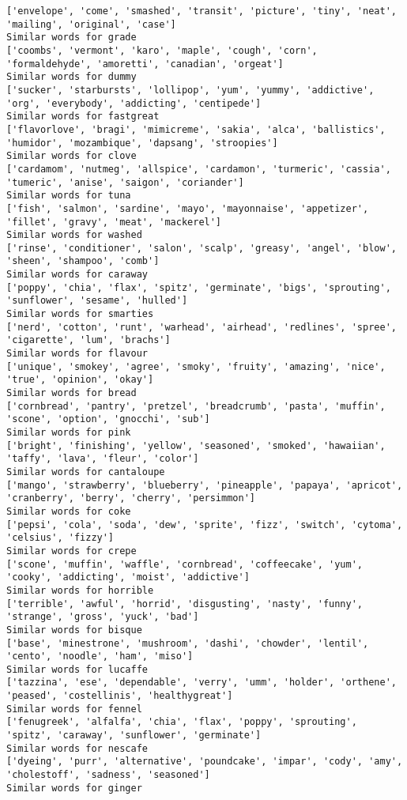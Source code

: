 \documentclass[11pt]{article}
\begin{document}
\begin{Verbatim}[commandchars=\\\{\}]
['envelope', 'come', 'smashed', 'transit', 'picture', 'tiny', 'neat', 'mailing', 'original', 'case']
Similar words for grade
['coombs', 'vermont', 'karo', 'maple', 'cough', 'corn', 'formaldehyde', 'amoretti', 'canadian', 'orgeat']
Similar words for dummy
['sucker', 'starbursts', 'lollipop', 'yum', 'yummy', 'addictive', 'org', 'everybody', 'addicting', 'centipede']
Similar words for fastgreat
['flavorlove', 'bragi', 'mimicreme', 'sakia', 'alca', 'ballistics', 'humidor', 'mozambique', 'dapsang', 'stroopies']
Similar words for clove
['cardamom', 'nutmeg', 'allspice', 'cardamon', 'turmeric', 'cassia', 'tumeric', 'anise', 'saigon', 'coriander']
Similar words for tuna
['fish', 'salmon', 'sardine', 'mayo', 'mayonnaise', 'appetizer', 'fillet', 'gravy', 'meat', 'mackerel']
Similar words for washed
['rinse', 'conditioner', 'salon', 'scalp', 'greasy', 'angel', 'blow', 'sheen', 'shampoo', 'comb']
Similar words for caraway
['poppy', 'chia', 'flax', 'spitz', 'germinate', 'bigs', 'sprouting', 'sunflower', 'sesame', 'hulled']
Similar words for smarties
['nerd', 'cotton', 'runt', 'warhead', 'airhead', 'redlines', 'spree', 'cigarette', 'lum', 'brachs']
Similar words for flavour
['unique', 'smokey', 'agree', 'smoky', 'fruity', 'amazing', 'nice', 'true', 'opinion', 'okay']
Similar words for bread
['cornbread', 'pantry', 'pretzel', 'breadcrumb', 'pasta', 'muffin', 'scone', 'option', 'gnocchi', 'sub']
Similar words for pink
['bright', 'finishing', 'yellow', 'seasoned', 'smoked', 'hawaiian', 'taffy', 'lava', 'fleur', 'color']
Similar words for cantaloupe
['mango', 'strawberry', 'blueberry', 'pineapple', 'papaya', 'apricot', 'cranberry', 'berry', 'cherry', 'persimmon']
Similar words for coke
['pepsi', 'cola', 'soda', 'dew', 'sprite', 'fizz', 'switch', 'cytoma', 'celsius', 'fizzy']
Similar words for crepe
['scone', 'muffin', 'waffle', 'cornbread', 'coffeecake', 'yum', 'cooky', 'addicting', 'moist', 'addictive']
Similar words for horrible
['terrible', 'awful', 'horrid', 'disgusting', 'nasty', 'funny', 'strange', 'gross', 'yuck', 'bad']
Similar words for bisque
['base', 'minestrone', 'mushroom', 'dashi', 'chowder', 'lentil', 'cento', 'noodle', 'ham', 'miso']
Similar words for lucaffe
['tazzina', 'ese', 'dependable', 'verry', 'umm', 'holder', 'orthene', 'peased', 'costellinis', 'healthygreat']
Similar words for fennel
['fenugreek', 'alfalfa', 'chia', 'flax', 'poppy', 'sprouting', 'spitz', 'caraway', 'sunflower', 'germinate']
Similar words for nescafe
['dyeing', 'purr', 'alternative', 'poundcake', 'impar', 'cody', 'amy', 'cholestoff', 'sadness', 'seasoned']
Similar words for ginger

\end{Verbatim}
\end{document}
